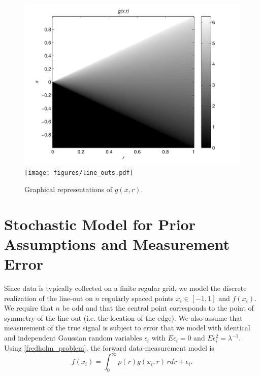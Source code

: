\documentclass{amsart}
\theoremstyle{plain}
\begin{document}
\begin{figure}[h]
  \begin{center}
  \includegraphics[width=.5\textwidth]{figures/g_function.pdf}
  \texttt{[image: figures/line\_outs.pdf]}
  \caption{Graphical representations of $g(x,r)$. } \label{g_figure}
  \end{center}
\end{figure} 

\section{Stochastic Model for Prior Assumptions and Measurement Error}
Since data is typically collected on a finite regular grid, we model the discrete realization of the line-out on $n$ regularly spaced points $x_i\in [-1,1]$ and $f(x_i)$.  
We require that $n$ be odd and that the central point corresponds to the point of symmetry of the line-out (i.e. the location of the edge).  
We also assume that measurement of the true signal is subject to error that we model with identical and independent Gaussian random variables $\epsilon_i$ with $ E \epsilon_i = 0$ and $E \epsilon_i^2 = \lambda^{-1}$.  
Using \eqref{fredholm_problem}, the forward data-measurement model is
\begin{equation}
  f(x_i) = \int_0^\infty \rho(r)g(x_i,r)\,rdr +  \epsilon_i. \label{stochastic_inv_problem} 
\end{equation}
\end{document}
